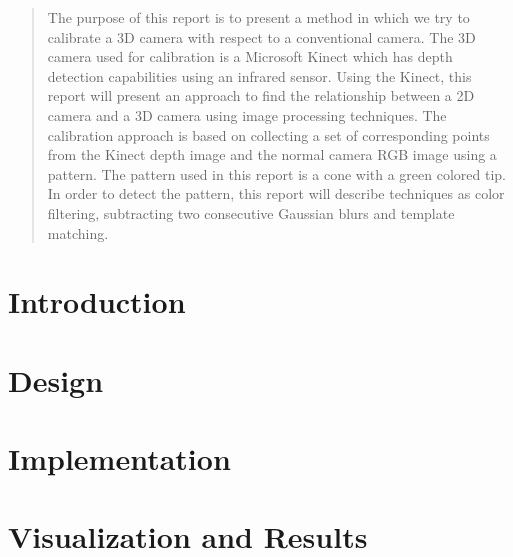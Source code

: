 \documentclass[a4paper,11pt]{report}
\begin{document}
\maketitle

\tableofcontents

\begin{abstract}
\noindent
The purpose of this report is to present a method in which we try to calibrate a 3D camera with respect to a conventional camera. The 3D camera used for calibration is a Microsoft Kinect which has depth detection capabilities using an infrared sensor. Using the Kinect, this report will present an approach to find the relationship between a 2D camera and a 3D camera using image processing techniques. The calibration approach is based on collecting a set of corresponding points from the Kinect depth image and the normal camera RGB image using a pattern. The pattern used in this report is a cone with a green colored tip. In order to detect the pattern, this report will describe techniques as color filtering, subtracting two consecutive Gaussian blurs and template matching. 
\end{abstract}

\chapter{Introduction}


\chapter{Design}


\chapter{Implementation}


\chapter{Visualization and Results}



\end{document}
